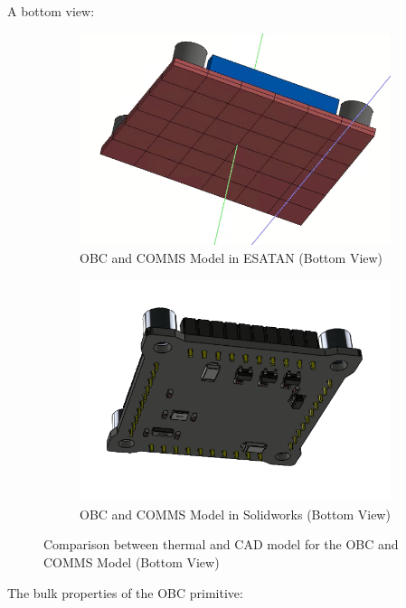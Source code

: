 A bottom view:

\begin{figure}[H]
  \centering
  \begin{subfigure}{.5\textwidth}
    \centering
    \includegraphics[width=.6\linewidth]{res/img/5_simulationanalisys/Comparisons/ESATAN/OBC_bot.PNG}
    \caption{OBC and COMMS Model in ESATAN (Bottom View)}
    \label{fig:obcbot}
  \end{subfigure}%
  \begin{subfigure}{.5\textwidth}
    \centering
    \includegraphics[width=.5\linewidth]{res/img/5_simulationanalisys/Comparisons/SLDW/OBC_Bot_Solid.PNG}
    \caption{OBC and COMMS Model in Solidworks (Bottom View)}
    \label{fig:obcbotsolid}
  \end{subfigure}
  \caption{Comparison between thermal and CAD model for the OBC and COMMS Model (Bottom View)}
  \label{fig:obcbotim}
\end{figure}

The bulk properties of the OBC primitive:

